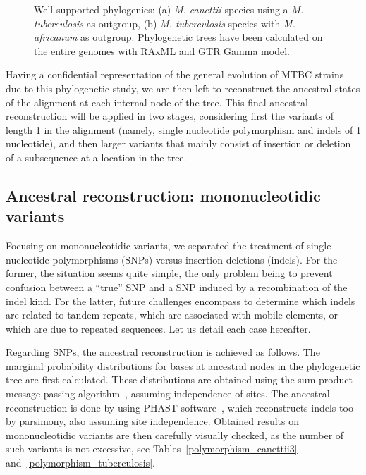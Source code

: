 \documentclass[runningheads,a4paper]{llncs}
\begin{document}
\begin{figure}[!htb]
\begin{minipage}{.5\linewidth}
\centering
{}
\end{minipage}%
\begin{minipage}{.5\linewidth}
\centering
{}
\end{minipage}\par\medskip
\centering
\caption{Well-supported phylogenies: (a) \textit{M. canettii} species using a \textit{M. tuberculosis} as outgroup, (b) \textit{M. tuberculosis} species with \textit{M. africanum} as outgroup. Phylogenetic trees have been calculated on the entire genomes with RAxML and GTR Gamma model.}
\end{figure}

Having a confidential representation of the general evolution of MTBC strains due to this phylogenetic study, we are then left to reconstruct the ancestral states of the alignment at each internal node of the tree. This final ancestral reconstruction will be applied in two stages, considering first the variants of length 1 in the alignment (namely, single nucleotide polymorphism and indels of 1 nucleotide), and then larger variants that mainly consist of insertion or deletion of a subsequence at a location in the tree.









\subsection{Ancestral reconstruction: mononucleotidic variants}

Focusing on mononucleotidic variants, we separated the treatment of single nucleotide polymorphisms (SNPs) versus insertion-deletions (indels). For the former, the situation seems quite simple, the only problem being to prevent confusion between a ``true'' SNP and a SNP induced by a recombination of the indel kind. For the latter, future challenges encompass to determine which indels are related to tandem repeats, which are associated with mobile elements, or which are due to repeated sequences. Let us detail each case hereafter.


Regarding SNPs, the ancestral reconstruction is achieved as follows. The marginal probability distributions for bases at ancestral nodes in the phylogenetic tree are first calculated. These distributions are obtained using the sum-product message passing algorithm~\cite{pearl1982reverend}, assuming independence of sites. The ancestral reconstruction is done by using PHAST software~\cite{hubisz2010phast}, which reconstructs indels too by parsimony, also assuming site independence. Obtained results on mononucleotidic variants are then carefully visually checked, as the number of such variants is not excessive, see Tables~\ref{polymorphism_canettii3} 
and~\ref{polymorphism_tuberculosis}. %
\end{document}

